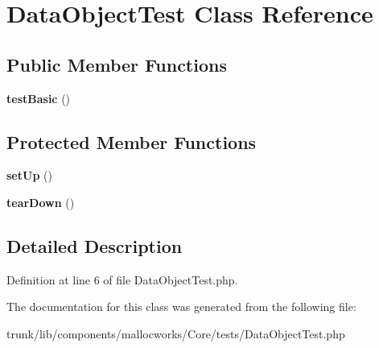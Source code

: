 \hypertarget{class_data_object_test}{
\section{DataObjectTest Class Reference}
\label{class_data_object_test}
}
\subsection*{Public Member Functions}
\begin{DoxyCompactItemize}
\item 
\hypertarget{class_data_object_test_a43130cb481135ee931f1562a1503378a}{
{\bfseries testBasic} ()}
\label{class_data_object_test_a43130cb481135ee931f1562a1503378a}

\end{DoxyCompactItemize}
\subsection*{Protected Member Functions}
\begin{DoxyCompactItemize}
\item 
\hypertarget{class_data_object_test_a0bc688732d2b3b162ffebaf7812e78da}{
{\bfseries setUp} ()}
\label{class_data_object_test_a0bc688732d2b3b162ffebaf7812e78da}

\item 
\hypertarget{class_data_object_test_a80fe3d17e658907fc75346a0ec9d6fc7}{
{\bfseries tearDown} ()}
\label{class_data_object_test_a80fe3d17e658907fc75346a0ec9d6fc7}

\end{DoxyCompactItemize}


\subsection{Detailed Description}


Definition at line 6 of file DataObjectTest.php.



The documentation for this class was generated from the following file:\begin{DoxyCompactItemize}
\item 
trunk/lib/components/mallocworks/Core/tests/DataObjectTest.php\end{DoxyCompactItemize}
